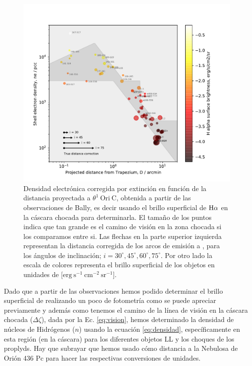 \begin{figure}
  \centering
   \includegraphics[width=\linewidth, clip]{luis-programas/will-nshell-vs-D.pdf}
  \caption{Densidad electrónica corregida por extinción en función de la distancia proyectada a \(\theta^1\ \text{Ori}\ \text{C}\), obtenida a partir de las observaciones de Bally, es decir usando el  brillo superficial de \(\mathrm{H}\alpha\) en la cáscara chocada para determinarla. El tamaño de los puntos indica que tan grande es el camino de visión en la zona chocada si los comparamos entre si. Las flechas en la parte superior izquierda representan la distancia corregida de los arcos de emisión a \thC{}, para los ángulos de inclinación; \(i = 30^{\circ}, 45^{\circ}, 60^{\circ}, 75^{\circ}\).  Por otro lado la escala de colores representa el brillo superficial de los objetos en unidades de [\(\mathrm{erg~s^{-1}~cm^{-2}~sr^{-1}}\)]. }
  \label{fig:density}
\end{figure}

Dado que a partir de las observaciones hemos podido determinar el brillo superficial de \ha{} realizando un poco de fotometría como se puede apreciar previamente y además como tenemos el camino de la línea de visión en la cáscara chocada (\(\Delta\zeta\)), dada por la Ec. \ref{eq:vision},  hemos determinado la densidad de núcleos de Hidrógenos (\(n\))  usando la ecuación \ref{eq:densidad}, específicamente en esta región (en la cáscara) para los diferentes objetos LL y los choques de los proplyds. Hay que subrayar que hemos usado cómo distancia a la Nebulosa de Orión 436 Pc para hacer las respectivas conversiones de unidades.\\ 

